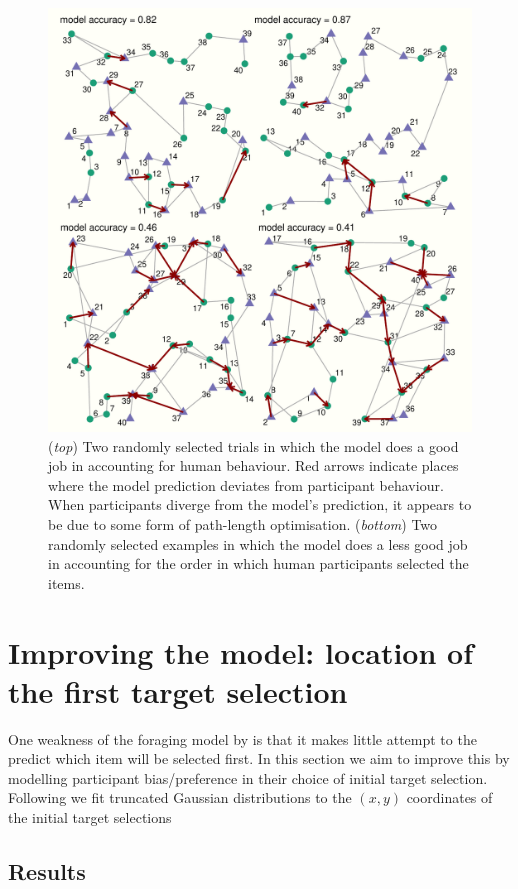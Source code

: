 \documentclass[vision,article,submit,pdftex,moreauthors]{Definitions/mdpi}
\begin{document}
\begin{figure}[H]
\centering
\includegraphics[width=12 cm]{Figures/qjep_ex_paths.pdf}
\caption{(\textit{top}) Two randomly selected trials in which the model does a good job in accounting for human behaviour. Red arrows indicate places where the model prediction deviates from participant behaviour. When participants diverge from the model's prediction, it appears to be due to some form of path-length optimisation. (\textit{bottom}) Two randomly selected examples in which the model does a less good job in accounting for the order in which human participants selected the items.}
\label{fig:qjep_paths}
\end{figure} 

\section{Improving the model: location of the first target selection}

One weakness of the foraging model by \cite{clarke2022foraging} is that it makes little attempt to the predict which item will be selected first. In this section we aim to improve this by modelling participant bias/preference in their choice of initial target selection. Following \cite{clarke_tatler2014, clarke2017} we fit truncated Gaussian distributions to the $(x,y)$ coordinates of the initial target selections 

\subsection{Results}
\end{document}

